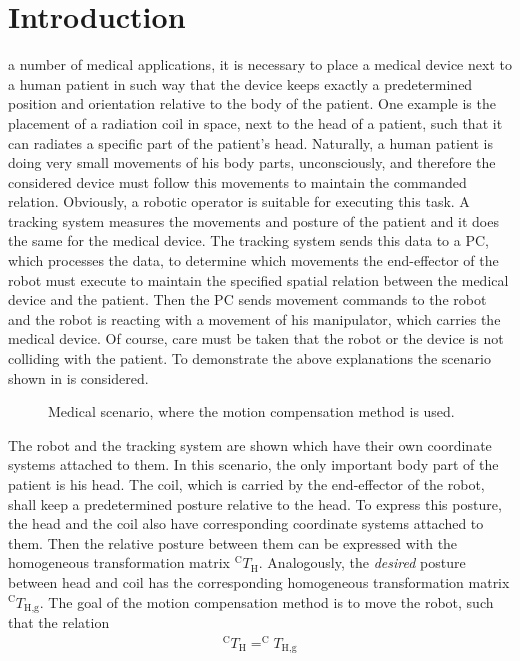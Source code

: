 \section{Introduction}
 a number of medical applications, it is necessary to place a medical device 
next to a human patient in such way that the device keeps exactly a predetermined position and 
orientation relative to the body of the patient. One example is the placement of a radiation 
coil in space, next to the head of a patient, such that it can radiates a specific part of 
the patient's head. Naturally, a human patient is doing very small movements of his body parts, unconsciously, and 
therefore the considered device must follow this movements to maintain the commanded relation. 
Obviously, a robotic operator is suitable for executing this task. A tracking system measures 
the movements and posture of the patient and it does the same for the medical device. The 
tracking system sends this data to a PC, which processes the data, to determine which 
movements the end-effector of the robot must execute to maintain the specified spatial relation 
between the medical device and the patient. Then the PC sends movement commands to the robot 
and the robot is reacting with a movement of his manipulator, which carries the medical 
device. Of course, care must be taken that the robot or the device is not colliding with the 
patient. To demonstrate the above explanations the scenario shown in  is considered. 
\begin{figure}
\centering

\caption{Medical scenario, where the motion compensation method is used.}
\label{fig:scenario}
\end{figure}
The robot and the tracking system are shown which have their own coordinate systems attached to them. In this scenario, the only important body part of the patient is his head. The coil, which is carried by the end-effector of the robot, shall keep a predetermined posture relative to the head. To express this posture, the head and the coil also have corresponding coordinate systems attached to them. Then the relative posture between them can be expressed with the homogeneous transformation matrix $^{\text{C}}T_{\text{H}}$. Analogously, the \textit{desired} posture between head and coil has the corresponding homogeneous transformation matrix $^{\text{C}}T_{\text{H,g}}$. The goal of the motion compensation method is to move the robot, such that the relation
\begin{align}
^{\text{C}}T_{\text{H}} = ^{\text{C}}T_{\text{H,g}}
\label{eq:desired_relation}
\end{align}
